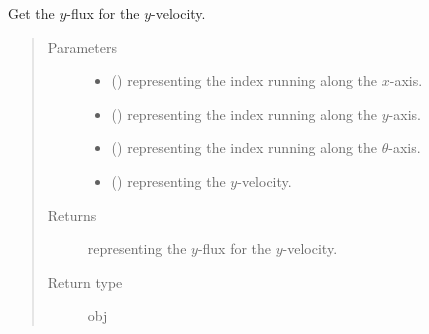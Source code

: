 \documentclass[letterpaper,10pt,english]{sphinxmanual}
\begin{document}
\begin{fulllineitems}
\begin{fulllineitems}
\begin{quote}
\begin{description}
\end{description}\end{quote}

\end{fulllineitems}


\begin{fulllineitems}
\label{\detokenize{api:tasmania.dycore.flux_isentropic_nonconservative_centered.FluxIsentropicNonconservativeCentered._get_centered_flux_y_v}}
Get the \(y\)-flux for the \(y\)-velocity.
\begin{quote}\begin{description}
\item[{Parameters}] \leavevmode\begin{itemize}
\item {} 
 () \textendash{}  representing the index running along the \(x\)-axis.

\item {} 
 () \textendash{}  representing the index running along the \(y\)-axis.

\item {} 
 () \textendash{}  representing the index running along the \(\theta\)-axis.

\item {} 
 () \textendash{}  representing the \(y\)-velocity.

\end{itemize}

\item[{Returns}] \leavevmode
{} representing the \(y\)-flux for the \(y\)-velocity.

\item[{Return type}] \leavevmode
obj

\end{description}\end{quote}

\end{fulllineitems}


\end{fulllineitems}
\end{document}
